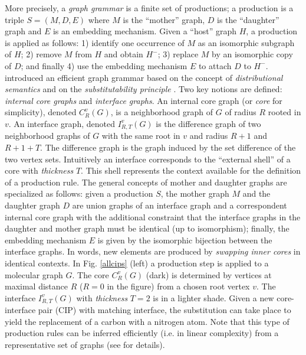 \documentclass{article}
\begin{document}
More precisely, a {\em graph grammar} \citep{rozenberg1999handbook} is a
finite set of productions; a production is a triple $S=(M,D,E)$ where $M$ is
the ``mother'' graph, $D$ is the ``daughter'' graph and $E$ is an embedding
mechanism. Given a ``host'' graph $H$, a production is applied as follows: 1)
identify one occurrence of $M$ as an isomorphic subgraph of $H$; 2) remove $M$
from $H$ and obtain $H^-$; 3) replace $M$ by an isomorphic copy of $D$; and
finally 4) use the embedding mechanism $E$ to attach $D$ to $H^-$.
\cite{costa16} introduced an efficient graph grammar based on the concept of
{\em distributional semantics}
\citep{harris1954distributional,harris1968mathematical} and on the {\em
substitutability principle} \citep{Clark:2007}. Two key notions are defined:
{\em internal core graphs} and {\em interface graphs}. An internal core graph
(or {\em core} for simplicity), denoted $C^v_R(G)$, is a neighborhood graph of
$G$ of radius $R$ rooted in $v$. An interface graph, denoted $I^v_{R,T}(G)$ is
the difference graph of two neighborhood graphs of $G$ with the same root in
$v$ and radius $R+1$ and $R+1+T$. The difference graph is the graph induced by
the set difference of the two vertex sets. Intuitively an interface
corresponds to the ``external shell'' of a core with {\em thickness} $T$. This
shell represents the context available for the definition of a production
rule. The general concepts of mother and daughter graphs are specialized as
follows: given a production $S$, the mother graph $M$ and the daughter graph
$D$ are union graphs of an interface graph and a correspondent internal core
graph with the additional constraint that the interface graphs in the daughter
and mother graph must be identical (up to isomorphism); finally, the embedding
mechanism $E$ is given by the isomorphic bijection between the interface
graphs. In words, new elements are produced by {\em swapping inner cores} in
identical contexts. In Fig. \ref{allcips} (left) a production step is applied
to a molecular graph $G$. The core $C_{R}^v(G)$ (dark) is determined by
vertices at maximal distance $R$ ($R=0$ in the figure) from a chosen root
vertex $v$. The interface $I_{R,T}^v(G)$ with \emph{thickness} $T=2$ is in a
lighter shade. Given a new core-interface pair (CIP) with matching interface,
the substitution can take place to yield the replacement of a carbon with a
nitrogen atom. Note that this type of production rules can be inferred
efficiently (i.e. in linear complexity) from a representative set of graphs
(see \citep{costa16} for details).
\end{document}
